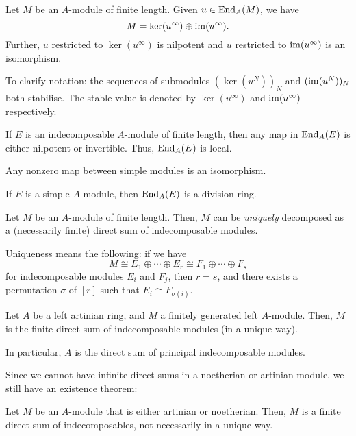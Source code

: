 \documentclass[12pt]{article}
\begin{document}
\begin{lem}[Fitting] 
	Let $M$ be an $A$-module of finite length. 
	Given $u \in \operatorname{End}_{A}(M)$, we have
	\begin{equation*} 
		M = \ker(u^{\infty}) \oplus \operatorname{im}(u^{\infty}).
	\end{equation*}
	Further, $u$ restricted to $\ker(u^{\infty})$ is nilpotent and $u$ restricted to $\operatorname{im}(u^{\infty})$ is an isomorphism.
\end{lem}
To clarify notation: the sequences of submodules $(\ker(u^{N}))_{N}$ and $(\operatorname{im}(u^{N}))_{N}$ both stabilise. 
The stable value is denoted by $\ker(u^{\infty})$ and $\operatorname{im}(u^{\infty})$ respectively.

\begin{cor}
	If $E$ is an indecomposable $A$-module of finite length, then any map in $\operatorname{End}_{A}(E)$ is either nilpotent or invertible. 
	Thus, $\operatorname{End}_{A}(E)$ is local.
\end{cor}

\begin{thm}[Schur]
	Any nonzero map between simple modules is an isomorphism.

	If $E$ is a simple $A$-module, then $\operatorname{End}_{A}(E)$ is a division ring.
\end{thm}

\begin{thm}
	Let $M$ be an $A$-module of finite length. 
	Then, $M$ can be \emph{uniquely} decomposed as a (necessarily finite) direct sum of indecomposable modules.

	Uniqueness means the following: if we have
	\begin{equation*} 
		M \cong E_{1} \oplus \cdots \oplus E_{r} \cong F_{1} \oplus \cdots \oplus F_{s}
	\end{equation*}
	for indecomposable modules $E_{i}$ and $F_{j}$, 
	then $r = s$, 
	and there exists a permutation $\sigma$ of $[r]$ such that 
	$E_{i} \cong F_{\sigma(i)}$.
\end{thm}
\begin{cor}
	Let $A$ be a left artinian ring, and $M$ a finitely generated left $A$-module. 
	Then, $M$ is the finite direct sum of indecomposable modules (in a unique way). 

	In particular, $A$ is the direct sum of principal indecomposable modules.
\end{cor}

Since we cannot have infinite direct sums in a noetherian or artinian module, we still have an existence theorem:
\begin{thm}
	Let $M$ be an $A$-module that is either artinian or noetherian. 
	Then, $M$ is a finite direct sum of indecomposables, not necessarily in a unique way.
\end{thm}
\end{document}

